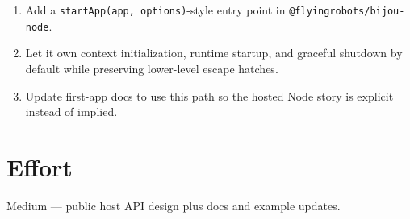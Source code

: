 \begin{enumerate}
\def\labelenumi{\arabic{enumi}.}
\tightlist
\item
  Add a \texttt{s\allowbreak{}t\allowbreak{}a\allowbreak{}r\allowbreak{}t\allowbreak{}A\allowbreak{}p\allowbreak{}p\allowbreak{}(\allowbreak{}a\allowbreak{}p\allowbreak{}p\allowbreak{},\allowbreak{} \allowbreak{}o\allowbreak{}p\allowbreak{}t\allowbreak{}i\allowbreak{}o\allowbreak{}n\allowbreak{}s\allowbreak{})}-style entry point in \texttt{@\allowbreak{}f\allowbreak{}l\allowbreak{}y\allowbreak{}i\allowbreak{}n\allowbreak{}g\allowbreak{}r\allowbreak{}o\allowbreak{}b\allowbreak{}o\allowbreak{}t\allowbreak{}s\allowbreak{}/\allowbreak{}b\allowbreak{}i\allowbreak{}j\allowbreak{}o\allowbreak{}u\allowbreak{}-\allowbreak{}n\allowbreak{}o\allowbreak{}d\allowbreak{}e}.
\item
  Let it own context initialization, runtime startup, and graceful shutdown by default while preserving lower-level escape hatches.
\item
  Update first-app docs to use this path so the hosted Node story is explicit instead of implied.
\end{enumerate}

\section{Effort}\label{record-325-effort}

Medium --- public host API design plus docs and example updates.


